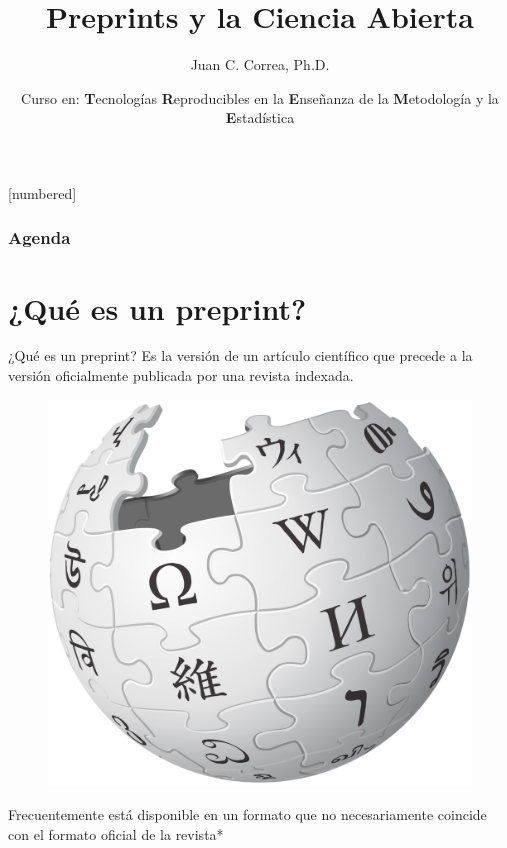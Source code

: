 \documentclass{beamer}
\begin{document}



\author[Juan C. Correa \textcolor{white}{(\url{https://correajc.com}})]{Juan C. Correa, Ph.D.}
\title[TREME 5: Preprints y Ciencia Abierta]{Preprints y la Ciencia Abierta}
[numbered]
\date[Bogotá, Junio-2021]{Curso en: \textbf{T}ecnologías \textbf{R}eproducibles en la \textbf{E}nseñanza de la \textbf{M}etodología y la \textbf{E}stadística}


\begin{frame}
	\titlepage
\end{frame}



\begin{frame}
\frametitle{Agenda} 
\tableofcontents
\end{frame}

\section{¿Qué es un preprint?}
\begin{frame}{¿Qué es un preprint?}
\Large
Es la versión de un artículo científico que precede a la versión oficialmente publicada por una revista indexada.
\begin{figure}
\centering
 \includegraphics[width=.2\textwidth]{Wikipedia}
\end{figure}
Frecuentemente está disponible en un formato que no necesariamente coincide con el formato oficial de la revista* 
\end{frame}
\end{document}
